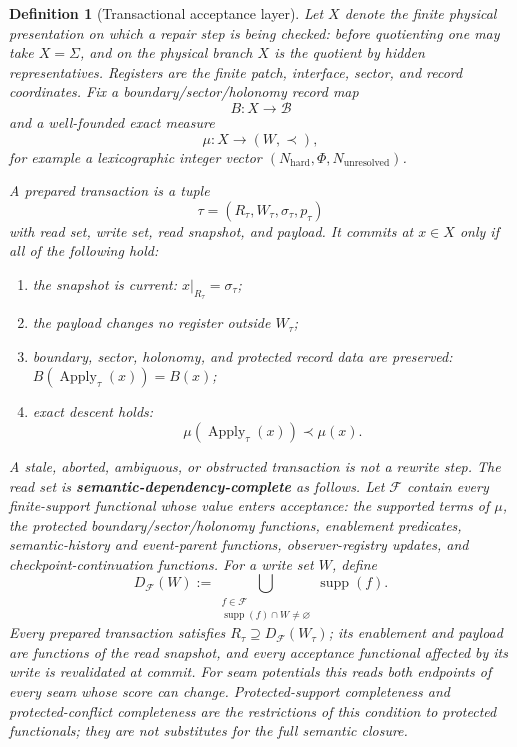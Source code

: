 \documentclass[11pt]{article}
\newtheorem{definition}[theorem]{Definition}
\theoremstyle{remark}
\theoremstyle{plain}
\begin{document}
\begin{definition}[Transactional acceptance layer]\label{def:transactional-repair}
Let \(X\) denote the finite physical presentation on which a repair step is being checked: before
quotienting one may take \(X=\Sigma\), and on the physical branch \(X\) is the quotient by hidden
representatives. Registers are the finite patch, interface, sector, and record coordinates. Fix a
boundary/sector/holonomy record map
\[
B:X\to\mathcal B
\]
and a well-founded exact measure
\[
\mu:X\to(W,\prec),
\]
for example a lexicographic integer vector
\((N_{\mathrm{hard}},\Phi,N_{\mathrm{unresolved}})\).

A prepared transaction is a tuple
\[
\tau=(R_\tau,W_\tau,\sigma_\tau,p_\tau)
\]
with read set, write set, read snapshot, and payload. It commits at \(x\in X\) only if all of the
following hold:
\begin{enumerate}[label=(\roman*),leftmargin=2em]
\item the snapshot is current: \(x|_{R_\tau}=\sigma_\tau\);
\item the payload changes no register outside \(W_\tau\);
\item boundary, sector, holonomy, and protected record data are preserved:
      \(B(\operatorname{Apply}_\tau(x))=B(x)\);
\item exact descent holds:
      \[
      \mu(\operatorname{Apply}_\tau(x))\prec \mu(x).
      \]
\end{enumerate}
A stale, aborted, ambiguous, or obstructed transaction is not a rewrite step. The read set is
\textbf{semantic-dependency-complete} as follows.  Let \(\mathcal F\) contain every finite-support
functional whose value enters acceptance: the supported terms of \(\mu\), the protected
boundary/sector/holonomy functions, enablement predicates, semantic-history and event-parent
functions, observer-registry updates, and checkpoint-continuation functions.  For a write set
\(W\), define
\[
D_{\mathcal F}(W)
:=
\bigcup_{\substack{f\in\mathcal F\\
\operatorname{supp}(f)\cap W\ne\varnothing}}
\operatorname{supp}(f).
\]
Every prepared transaction satisfies \(R_\tau\supseteq D_{\mathcal F}(W_\tau)\); its enablement
and payload are functions of the read snapshot, and every acceptance functional affected by its
write is revalidated at commit.  For seam potentials this reads both endpoints of every seam
whose score can change.  Protected-support completeness and protected-conflict completeness are
the restrictions of this condition to protected functionals; they are not substitutes for the
full semantic closure.


\end{definition}
\end{document}

